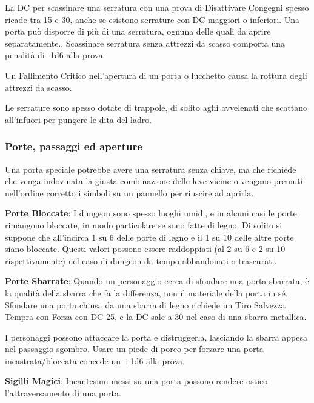 \begin{multicols}{2}
La DC per scassinare una serratura con una prova di Disattivare Congegni spesso ricade tra 15 e 30, anche se esistono serrature con DC maggiori o inferiori. Una porta può disporre di più di una serratura, ognuna delle quali da aprire separatamente.. Scassinare serratura senza attrezzi da scasso comporta una penalità di -1d6 alla prova.\hypertarget{Attrezzi da scasso}{}

Un Fallimento Critico nell'apertura di un porta o lucchetto causa la rottura degli attrezzi da scasso.

Le serrature sono spesso dotate di trappole, di solito aghi avvelenati che scattano all'infuori per pungere le dita del ladro.

\subsubsection{Porte, passaggi ed aperture}

Una porta speciale potrebbe avere una serratura senza chiave, ma che richiede che venga indovinata la giusta combinazione delle leve vicine o vengano premuti nell'ordine corretto i simboli su un pannello per riuscire ad aprirla.

\textbf{Porte Bloccate}: I dungeon sono spesso luoghi umidi, e in alcuni casi le porte rimangono bloccate, in modo particolare se sono fatte di legno. Di solito si suppone che all'incirca 1 su 6 delle porte di legno e il 1 su 10 delle altre porte siano bloccate. Questi valori possono essere raddoppiati (al 2 su 6 e 2 su 10 rispettivamente) nel caso di dungeon da tempo abbandonati o trascurati.

\textbf{Porte Sbarrate}: Quando un personaggio cerca di sfondare una porta sbarrata, è la qualità della sbarra che fa la differenza, non il materiale della porta in sé. Sfondare una porta chiusa da una sbarra di legno richiede un Tiro Salvezza Tempra con Forza con DC 25, e la DC sale a 30 nel caso di una sbarra metallica.

I personaggi possono attaccare la porta e distruggerla, lasciando la sbarra appesa nel passaggio sgombro. Usare un piede di porco per forzare una porta incastrata/bloccata concede un +1d6 alla prova.

\textbf{Sigilli Magici}: Incantesimi messi su una porta possono rendere ostico l'attraversamento di una porta.


\end{multicols}
